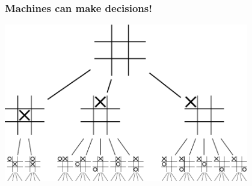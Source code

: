 \documentclass{beamer}
\begin{document}
\begin{frame}
  \frametitle{Machines can make decisions!}
  \begin{center}
    \includegraphics[width=0.8\textwidth]{../figures/Tic-tac-toe-game-tree}
  \end{center}
\end{frame}
\end{document}
